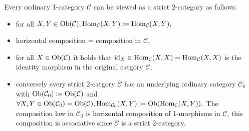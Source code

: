 \begin{rmk}
	Every ordinary 1-category $ \mathcal{ C } $  can be viewed as a strict 2-category as follows:
	\begin{itemize}
		\item 
		for all $ X , Y \in \operatorname{Ob} ( \mathcal{ C } ) , \operatorname{Hom}_{\mathcal{ C } } ( X , Y ) \coloneqq \operatorname{Hom}_{ \mathcal {C } }  ( X , Y ),$
		
		\item 
		horizontal composition = composition in $ \mathcal{ C } $,
		
		\item 
		for all $ X \in \operatorname{Ob} ( \mathcal{ C } )\label{key} $ it holds that $ \operatorname{id}_X \in \operatorname{Hom}_ { \mathcal{ C } } ( X , X ) = \operatorname{Hom}_{ \mathcal{ C } } ( X , X ) $ is the identity morphism in the original catgory $ \mathcal{ C }$,
			
		\item 
		conversely every strict 2-catgory $ \mathcal{ C } $ has an underlying ordinary category $ \mathcal{ C }_0 $ with $ \operatorname{Ob} ( \mathcal{ C }_0 ) \coloneqq \operatorname{Ob} ( \mathcal{ C } )$
		and $ \forall X , Y \in \operatorname{Ob} ( \mathcal{ C }_0 ) = \operatorname{Ob} ( \mathcal{ C } ), \operatorname{Hom}_{ \mathcal{ C }_0 } ( X , Y  ) \coloneqq \operatorname{Ob} ( \operatorname{Hom}_{ \mathcal{ C } }( X ,Y ) ).$
		The composition law in $ \mathcal{ C }_0 $ is horizontal composition of 1-morphisms in $ \mathcal{ C } $, this composition is associative since $ \mathcal{ C } $ is a strict 2-category.  
	\end{itemize}
\end{rmk}

